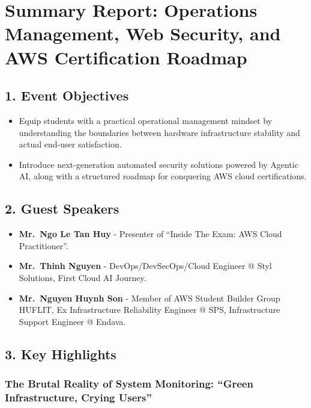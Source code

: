 \hypertarget{summary-report-operations-management-web-security-and-aws-certification-roadmap}{%
\section{Summary Report: Operations Management, Web Security, and AWS
Certification
Roadmap}}

\hypertarget{event-objectives}{%
\subsection{1. Event Objectives}}

\begin{itemize}
\tightlist
\item
  Equip students with a practical operational management mindset by
  understanding the boundaries between hardware infrastructure stability
  and actual end-user satisfaction.
\item
  Introduce next-generation automated security solutions powered by
  Agentic AI, along with a structured roadmap for conquering AWS cloud
  certifications.
\end{itemize}

\hypertarget{guest-speakers}{%
\subsection{2. Guest Speakers}}

\begin{itemize}
\tightlist
\item
  \textbf{Mr.~Ngo Le Tan Huy} - Presenter of ``Inside The Exam: AWS
  Cloud Practitioner''.
\item
  \textbf{Mr.~Thinh Nguyen} - DevOps/DevSecOps/Cloud Engineer @ Styl
  Solutions, First Cloud AI Journey.
\item
  \textbf{Mr.~Nguyen Huynh Son} - Member of AWS Student Builder Group
  HUFLIT, Ex Infrastructure Reliability Engineer @ SPS, Infrastructure
  Support Engineer @ Endava.
\end{itemize}

\hypertarget{key-highlights}{%
\subsection{3. Key Highlights}}

\hypertarget{the-brutal-reality-of-system-monitoring-green-infrastructure-crying-users}{%
\subsubsection{The Brutal Reality of System Monitoring: ``Green
Infrastructure, Crying
Users''}}

